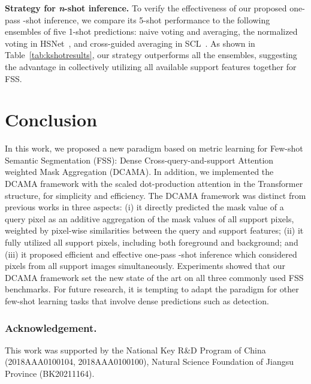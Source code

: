 \documentclass[runningheads,table,xcdraw]{llncs}
\begin{document}
\textbf{Strategy for \textit{n}-shot inference.}
To verify the effectiveness of our proposed one-pass -shot inference, we compare its 5-shot performance to the following ensembles of five 1-shot predictions:
naive voting and averaging, the normalized voting in HSNet~\cite{min2021hypercorrelation}, and cross-guided averaging in SCL~\cite{zhang2021self}.
As shown in Table~\ref{tab:kshotresults}, our strategy outperforms all the
ensembles, suggesting the advantage in collectively utilizing all available support features together
for FSS.


\section{Conclusion}
\label{sec:con}
In this work, we proposed a new paradigm based on metric learning for Few-shot Semantic Segmentation (FSS): Dense Cross-query-and-support Attention weighted Mask Aggregation (DCAMA).
In addition, we implemented the DCAMA framework with the scaled dot-production attention in the Transformer structure, for simplicity and efficiency.
The DCAMA framework was distinct from previous works in three aspects: (i) it directly predicted the mask value of a query pixel as an additive aggregation of the mask values of all support pixels, weighted by pixel-wise similarities between the query and support features;
(ii) it fully utilized all support pixels, including both foreground and background; and
(iii) it proposed efficient and effective one-pass -shot inference which considered pixels from all support images simultaneously.
Experiments showed that our DCAMA framework set the new state of the art on all three commonly used FSS benchmarks.
For future research, it is tempting to adapt the paradigm for other few-shot learning tasks that involve dense predictions such as detection.


\subsubsection{Acknowledgement.} This work was supported by the National Key
R\&D Program of China (2018AAA0100104, 2018AAA0100100), Natural Science Foundation of Jiangsu Province (BK20211164).
\end{document}
